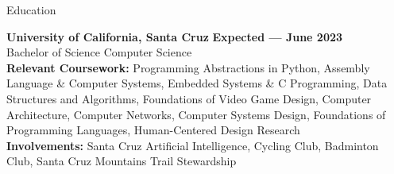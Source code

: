 \documentclass{resume}
\begin{document}
\begin{rSection}{\large Education}

{\bf University of California, Santa Cruz} \hfill {\bf{Expected --- June 2023}}
\\ Bachelor of Science Computer Science\hfill %
  \\ \textbf{Relevant Coursework:} Programming Abstractions in Python, Assembly Language \& Computer Systems, Embedded Systems \& C Programming, Data Structures and Algorithms, Foundations of Video Game Design, Computer Architecture, Computer Networks, Computer Systems Design, Foundations of Programming Languages, Human-Centered Design Research
\\ \textbf{Involvements:}  Santa Cruz Artificial Intelligence, Cycling Club, Badminton Club, Santa Cruz Mountains Trail Stewardship 

\end{rSection}
\end{document}

